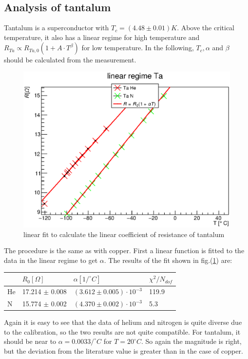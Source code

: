 \documentclass{article}
\begin{document}
\subsection{Analysis of tantalum}
Tantalum is a superconductor with $T_c = (4.48 \pm 0.01)K$. Above the critical temperature, it also has a linear regime for high temperature and $R_{Ta} \propto R_{Ta,0}(1+A\cdot T^\beta)$ for low temperature.
In the following, $T_c, \alpha$ and $\beta$ should be calculated from the measurement.\\
\begin{figure}[H]
    \centering
    \includegraphics[width=\textwidth]{Graphen/Ta_lin.eps}
    \caption{linear fit to calculate the linear coefficient of resistance of tantalum}
    \label{lin_Ta}
\end{figure}
The procedure is the same as with copper. First a linear function is fitted to the data in the linear regime to get $\alpha$. The results of the fit shown in fig.(\ref{lin_Ta}) are:
\begin{table}[H]
    \centering
        \begin{tabular}{l|l|l|l}
         & $R_0 [\Omega]$ & $\alpha [1 / ^\circ C]$ & $\chi^2/N_{dof}$\\\hline
        He & 17.214 $\pm$  0.008  & $(3.612 \pm 0.005)\cdot 10^{-3}$ & 119.9 \\\hline
        N &  15.774 $\pm$ 0.002 &  $(4.370 \pm 0.002)\cdot 10^{-3}$ & 5.3
        \end{tabular}
\end{table}
Again it is easy to see that the data of helium and nitrogen is quite diverse due to the calibration, so the two results are not quite compatible. For tantalum, it should be near to $\alpha = 0.0033 / ^\circ C$ for $T = 20 ^\circ C$. So again the magnitude is right, but the deviation from the literature value is greater than in the case of copper.\\
\end{document}
